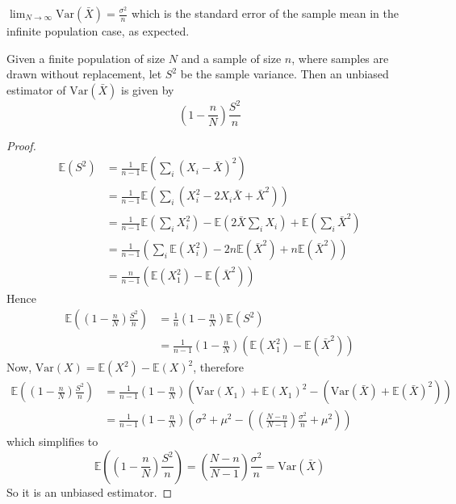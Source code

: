 \begin{remark}
	$\lim_{N \rightarrow \infty} \text{Var}(\bar{X}) = \frac{\sigma^2}{n}$ which is the standard error of the sample mean in the infinite population case, as expected.
\end{remark}

\begin{theorem}
	Given a finite population of size $N$ and a sample of size $n$, where samples are drawn without replacement, let $S^2$ be the sample variance. Then an unbiased estimator of $\text{Var}(\bar{X})$ is given by
	\[
		\left( 1 - \frac{n}{N} \right) \frac{S^2}{n}
	\]
\end{theorem}

\begin{proof}
	\[
		\begin{aligned}
			\mathbb{E}(S^2)
				& = \frac{1}{n - 1} \mathbb{E} \left( \sum_{i} {\left( X_i - \bar{X} \right)}^2 \right) \\
				& = \frac{1}{n - 1} \mathbb{E} \left( \sum_i \left( X_i^2 - 2X_i \bar{X} + \bar{X}^2 \right) \right) \\
				& = \frac{1}{n - 1} \mathbb{E} \left( \sum_{i} X_i^2 \right) - \mathbb{E} \left( 2 \bar{X} \sum_i X_i \right) + \mathbb{E} \left( \sum_i \bar{X}^2 \right) \\
				& = \frac{1}{n - 1} \left( \sum_i \mathbb{E} \left( X_i^2 \right) - 2n \mathbb{E} \left( \bar{X}^2 \right) + n \mathbb{E} \left( \bar{X}^2 \right) \right) \\
				& = \frac{n}{n - 1} \left( \mathbb{E} \left( X_1^2 \right) - \mathbb{E} \left( \bar{X}^2 \right) \right)
		\end{aligned}
	\]
	Hence
	\[
		\begin{aligned}
			\mathbb{E} \left( \left( 1 - \frac{n}{N} \right) \frac{S^2}{n} \right)
				& = \frac{1}{n} \left( 1 - \frac{n}{N} \right) \mathbb{E} (S^2) \\
				& = \frac{1}{n - 1} \left( 1 - \frac{n}{N} \right) \left( \mathbb{E} \left( X_1^2 \right) - \mathbb{E} \left( \bar{X}^2 \right) \right)
		\end{aligned}
	\]
	Now, $\text{Var}(X) = \mathbb{E} \left( X^2 \right) - \mathbb{E} {\left( X \right)}^2$, therefore
	\[
		\begin{aligned}
			\mathbb{E} \left( \left( 1 - \frac{n}{N} \right) \frac{S^2}{n} \right)
				& = \frac{1}{n - 1} \left( 1 - \frac{n}{N} \right) \left( \text{Var}(X_1) + \mathbb{E} {\left( X_1 \right)}^2 - \left( \text{Var} (\bar{X}) + \mathbb{E} {\left( \bar{X} \right)}^2 \right) \right) \\
				& = \frac{1}{n - 1} \left( 1 - \frac{n}{N} \right) \left( \sigma^2 + \mu^2 - \left( \left( \frac{N - n}{N - 1} \right) \frac{\sigma^2}{n} + \mu^2 \right) \right)
		\end{aligned}
	\]
	which simplifies to
	\[
		\mathbb{E} \left( \left( 1 - \frac{n}{N} \right) \frac{S^2}{n} \right) = \left( \frac{N - n}{N - 1} \right) \frac{\sigma^2}{n} = \text{Var}(\bar{X})
	\]
	So it is an unbiased estimator.
\end{proof}

